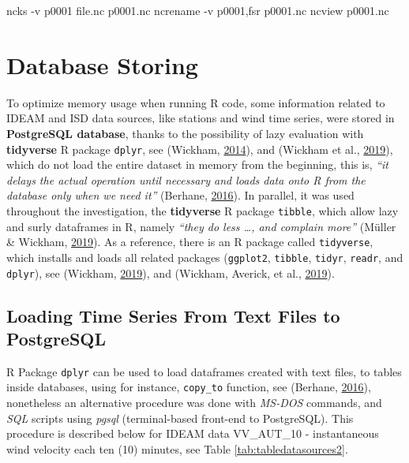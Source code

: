 \documentclass[12pt,oneside]{reedthesis}
\newenvironment{Shaded}{\begin{snugshade}}{\end{snugshade}}
\newcommand{\ExtensionTok}[1]{#1}
\newcommand{\NormalTok}[1]{#1}
\begin{document}
\scriptsize

\vspace{0.4cm}
\begin{Shaded}
\begin{Highlighting}[]
      \ExtensionTok{ncks}\NormalTok{ -v p0001 file.nc p0001.nc}
      \ExtensionTok{ncrename}\NormalTok{ -v p0001,fsr p0001.nc}
      \ExtensionTok{ncview}\NormalTok{ p0001.nc}
\end{Highlighting}
\end{Shaded}
\normalsize

\hypertarget{dbstoring}{%
\chapter{Database Storing}\label{dbstoring}}

To optimize memory usage when running R code, some information related to IDEAM and ISD data sources, like stations and wind time series, were stored in \textbf{PostgreSQL database}, thanks to the possibility of lazy evaluation with \textbf{tidyverse} R package \texttt{dplyr}, see (Wickham, \protect\hyperlink{ref-Wickham2014}{2014}), and (Wickham et al., \protect\hyperlink{ref-Wickham2019}{2019}), which do not load the entire dataset in memory from the beginning, this is, \emph{``it delays the actual operation until necessary and loads data onto R from the database only when we need it''} (Berhane, \protect\hyperlink{ref-databasesinr}{2016}). In parallel, it was used throughout the investigation, the \textbf{tidyverse} R package \texttt{tibble}, which allow lazy and surly dataframes in R, namely \emph{``they do less \ldots, and complain more''} (Müller \& Wickham, \protect\hyperlink{ref-Mueller2019}{2019}). As a reference, there is an R package called \texttt{tidyverse}, which installs and loads all related packages (\texttt{ggplot2}, \texttt{tibble}, \texttt{tidyr}, \texttt{readr}, and \texttt{dplyr}), see (Wickham, \protect\hyperlink{ref-Wickham2019a}{2019}), and (Wickham, Averick, et al., \protect\hyperlink{ref-Wickham2019b}{2019}).

\hypertarget{loading-time-series-from-text-files-to-postgresql}{%
\section{Loading Time Series From Text Files to PostgreSQL}\label{loading-time-series-from-text-files-to-postgresql}}

R Package \texttt{dplyr} can be used to load dataframes created with text files, to tables inside databases, using for instance, \texttt{copy\_to} function, see (Berhane, \protect\hyperlink{ref-databasesinr}{2016}), nonetheless an alternative procedure was done with \emph{MS-DOS} commands, and \emph{SQL} scripts using \emph{pgsql} (terminal-based front-end to PostgreSQL). This procedure is described below for IDEAM data VV\_AUT\_10 - instantaneous wind velocity each ten (10) minutes, see Table \ref{tab:tabledatasources2}.
\end{document}
